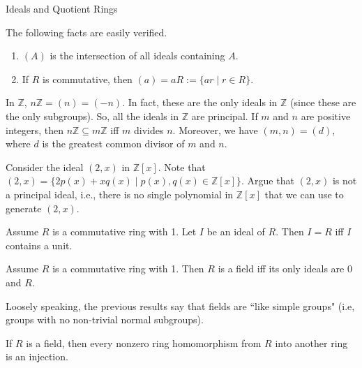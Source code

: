 \begin{section}{Ideals and Quotient Rings}
\begin{remark}
The following facts are easily verified.
\begin{enumerate}[label=\rm{(\alph*)}]
\item $(A)$ is the intersection of all ideals containing $A$.
\item If $R$ is commutative, then $(a)=aR:=\{ar\mid r\in R\}$.
\end{enumerate}
\end{remark}

\begin{example}\label{ex:PrincipalIdeals}
In $\mathbb{Z}$, $n\mathbb{Z}=(n)=(-n)$.  In fact, these are the only ideals in $\mathbb{Z}$ (since these are the only subgroups). So, all the ideals in $\mathbb{Z}$ are principal. If $m$ and $n$ are positive integers, then $n\mathbb{Z}\subseteq m\mathbb{Z}$ iff $m$ divides $n$.  Moreover, we have $(m,n)=(d)$, where $d$ is the greatest common divisor of $m$ and $n$.
\end{example}

\begin{problem}
Consider the ideal $(2,x)$ in $\mathbb{Z}[x]$. Note that $(2,x)=\{2p(x)+xq(x)\mid p(x),q(x)\in\mathbb{Z}[x]\}$.  Argue that $(2,x)$ is not a principal ideal, i.e., there is no single polynomial in $\mathbb{Z}[x]$ that we can use to generate $(2,x)$.
\end{problem}

\begin{theorem}
Assume $R$ is a commutative ring with 1. Let $I$ be an ideal of $R$. Then $I=R$ iff $I$ contains a unit.
\end{theorem}

\begin{theorem}
Assume $R$ is a commutative ring with 1.  Then $R$ is a field iff its only ideals are $0$ and $R$.
\end{theorem}

Loosely speaking, the previous results say that fields are ``like simple groups" (i.e, groups with no non-trivial normal subgroups).

\begin{corollary}\label{cor:HomFromField}
If $R$ is a field, then every nonzero ring homomorphism from $R$ into another ring is an injection.
\end{corollary}

\end{section}

